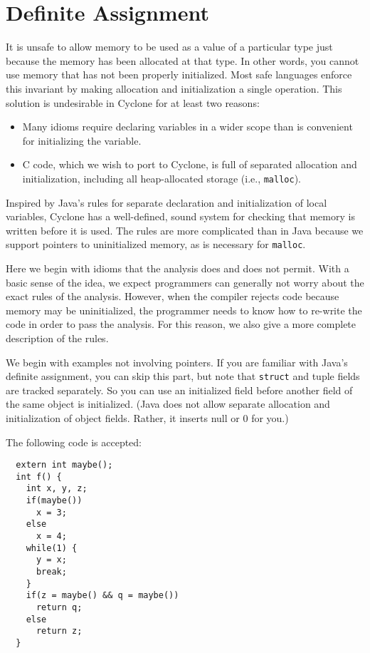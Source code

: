 \section{Definite Assignment}
 
It is unsafe to allow memory to be used as a value of a particular
type just because the memory has been allocated at that type.  In
other words, you cannot use memory that has not been properly
initialized.  Most safe languages enforce this invariant by making
allocation and initialization a single operation.  This solution is
undesirable in Cyclone for at least two reasons:
\begin{itemize}
\item Many idioms require declaring variables in a wider scope than is
  convenient for initializing the variable.
\item C code, which we wish to port to Cyclone, is full of separated
  allocation and initialization, including all heap-allocated storage
  (i.e., \texttt{malloc}).
\end{itemize}

Inspired by Java's rules for separate declaration and initialization
of local variables, Cyclone has a well-defined, sound system for
checking that memory is written before it is used.  The rules are more
complicated than in Java because we support pointers to uninitialized
memory, as is necessary for \texttt{malloc}.

Here we begin with idioms that the analysis does and does not permit.
With a basic sense of the idea, we expect programmers can generally
not worry about the exact rules of the analysis.  However, when the
compiler rejects code because memory may be uninitialized, the
programmer needs to know how to re-write the code in order to pass the
analysis.  For this reason, we also give a more complete description
of the rules.

We begin with examples not involving pointers.  If you are familiar
with Java's definite assignment, you can skip this part, but note that
\texttt{struct} and tuple fields are tracked separately.  So you can use
an initialized field before another field of the same object is
initialized.  (Java does not allow separate allocation and
initialization of object fields.  Rather, it inserts null or 0 for
you.)

The following code is accepted:
\begin{verbatim}
  extern int maybe();
  int f() {
    int x, y, z;
    if(maybe())
      x = 3;
    else
      x = 4;
    while(1) {
      y = x;
      break;
    }
    if(z = maybe() && q = maybe())
      return q;
    else
      return z;
  }
\end{verbatim}

